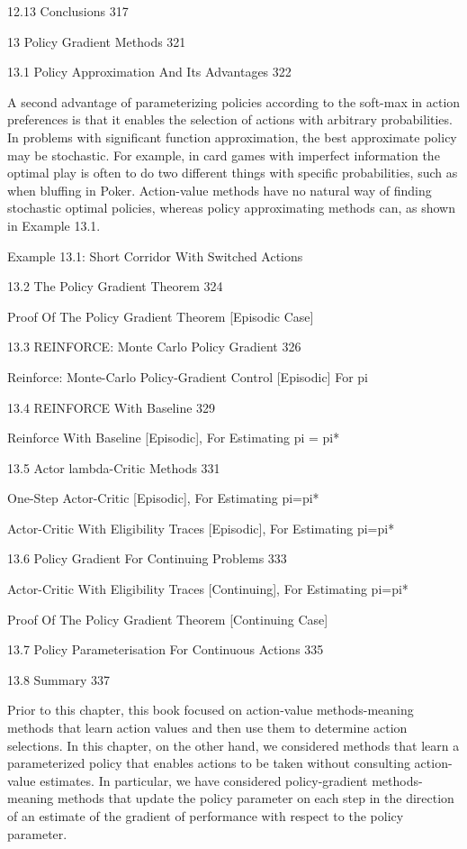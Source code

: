 12.13 Conclusions 317



13 Policy Gradient Methods 321



13.1 Policy Approximation And Its Advantages 322

A second advantage of parameterizing policies according to the soft-max in action preferences is that it enables the selection of actions with arbitrary probabilities. In problems with significant function approximation, the best approximate policy may be stochastic. For example, in card games with imperfect information the optimal play is often to do two different things with specific probabilities, such as when bluffing in Poker. Action-value methods have no natural way of finding stochastic optimal policies, whereas policy approximating methods can, as shown in Example 13.1.

Example 13.1: Short Corridor With Switched Actions

13.2 The Policy Gradient Theorem 324

Proof Of The Policy Gradient Theorem [Episodic Case]

13.3 REINFORCE: Monte Carlo Policy Gradient 326

Reinforce: Monte-Carlo Policy-Gradient Control [Episodic] For pi

13.4 REINFORCE With Baseline 329

Reinforce With Baseline [Episodic], For Estimating pi = pi*

13.5 Actor lambda-Critic Methods 331

One-Step Actor-Critic [Episodic], For Estimating pi=pi*

Actor-Critic With Eligibility Traces [Episodic], For Estimating pi=pi*

13.6 Policy Gradient For Continuing Problems 333

Actor-Critic With Eligibility Traces [Continuing], For Estimating pi=pi*

Proof Of The Policy Gradient Theorem [Continuing Case]

13.7 Policy Parameterisation For Continuous Actions 335



13.8 Summary 337

Prior to this chapter, this book focused on action-value methods-meaning methods that learn action values and then use them to determine action selections. In this chapter, on the other hand, we considered methods that learn a parameterized policy that enables actions to be taken without consulting action-value estimates. In particular, we have considered policy-gradient methods-meaning methods that update the policy parameter on each step in the direction of an estimate of the gradient of performance with respect to the policy parameter.

